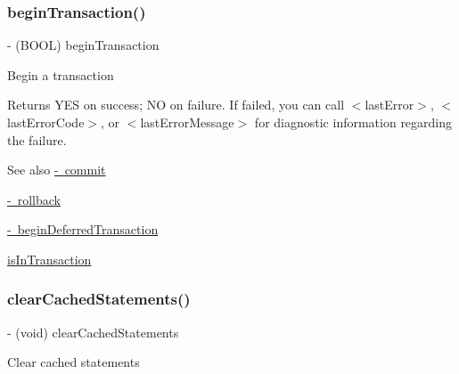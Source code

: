 \subsubsection{\texorpdfstring{begin\+Transaction()}{beginTransaction()}}
{\footnotesize\ttfamily -\/ (B\+O\+OL) begin\+Transaction \begin{DoxyParamCaption}{ }\end{DoxyParamCaption}}

Begin a transaction

\begin{DoxyReturn}{Returns}
{\ttfamily Y\+ES} on success; {\ttfamily NO} on failure. If failed, you can call {\ttfamily $<$last\+Error$>$}, {\ttfamily $<$last\+Error\+Code$>$}, or {\ttfamily $<$last\+Error\+Message$>$} for diagnostic information regarding the failure.
\end{DoxyReturn}
\begin{DoxySeeAlso}{See also}
\mbox{\hyperlink{interface_o_p_t_l_y_f_m_d_b_database_a13149a1989b1cdb7a6f7b8f2b4207cfd}{-\/ commit}} 

\mbox{\hyperlink{interface_o_p_t_l_y_f_m_d_b_database_a511569a0ee0c82136255920ebe9d28e6}{-\/ rollback}} 

\mbox{\hyperlink{interface_o_p_t_l_y_f_m_d_b_database_ae42926b392d7862b8e4a2c7da6e12552}{-\/ begin\+Deferred\+Transaction}} 

\mbox{\hyperlink{interface_o_p_t_l_y_f_m_d_b_database_aad9ac9a8b17ad02d9595a11567ceb404}{is\+In\+Transaction}} 
\end{DoxySeeAlso}
\mbox{\label{interface_o_p_t_l_y_f_m_d_b_database_a749d75414bd0c8525bcec404b9c746f1}} 
\subsubsection{\texorpdfstring{clear\+Cached\+Statements()}{clearCachedStatements()}}
{\footnotesize\ttfamily -\/ (void) clear\+Cached\+Statements \begin{DoxyParamCaption}{ }\end{DoxyParamCaption}}

Clear cached statements \mbox{\label{interface_o_p_t_l_y_f_m_d_b_database_a6979a72ddb72bf8187a06607943bee98}} 
